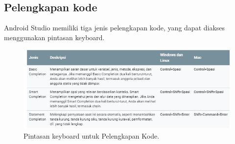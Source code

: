 \subsection{Pelengkapan kode}
\par Android Studio memiliki tiga jenis pelengkapan kode, yang dapat diakses menggunakan pintasan keyboard.
 \begin{figure}[H]
    \centering
    \includegraphics[width=1\textwidth]{figures/android8.png}
    \caption{ Pintasan keyboard untuk Pelengkapan Kode.}
    \label{print}
    \end{figure}
    
